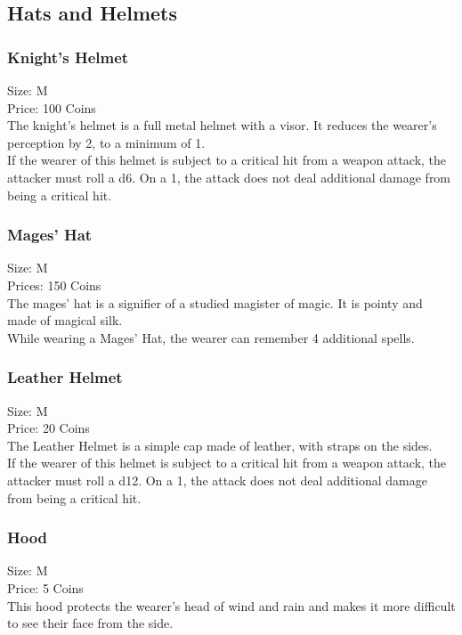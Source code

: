 \subsection{Hats and Helmets}\label{subsec:helmets}

\subsubsection{Knight's Helmet}\label{item:knightHelment}
Size: M\\
Price: 100 Coins\\
The knight's helmet is a full metal helmet with a visor.
It reduces the wearer's perception by 2, to a minimum of 1.\\
If the wearer of this helmet is subject to a critical hit from a weapon attack, the attacker must roll a d6.
On a 1, the attack does not deal additional damage from being a critical hit.\\

\subsubsection{Mages' Hat}\label{item:mageHat}
Size: M\\
Prices: 150 Coins\\
The mages' hat is a signifier of a studied magister of magic.
It is pointy and made of magical silk.\\
While wearing a Mages' Hat, the wearer can remember 4 additional spells.\\

\subsubsection{Leather Helmet}\label{item:leatherHelmet}
Size: M\\
Price: 20 Coins\\
The Leather Helmet is a simple cap made of leather, with straps on the sides.\\
If the wearer of this helmet is subject to a critical hit from a weapon attack, the attacker must roll a d12.
On a 1, the attack does not deal additional damage from being a critical hit.\\

\subsubsection{Hood}\label{item:hood}
Size: M\\
Price: 5 Coins\\
This hood protects the wearer's head of wind and rain and makes it more difficult to see their face from the side.\\

